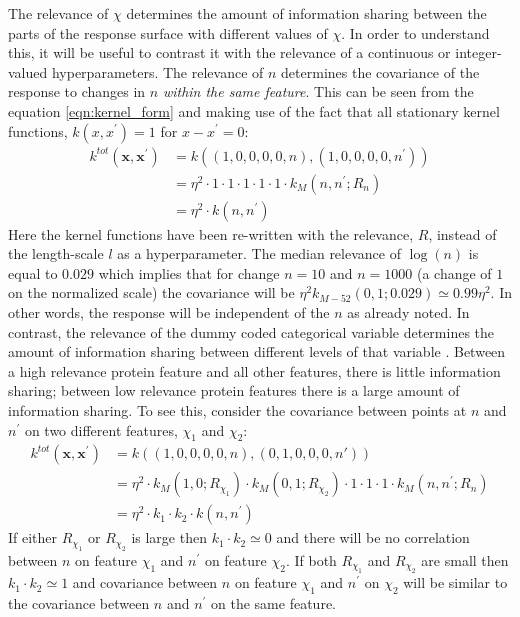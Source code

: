 The relevance of $\chi$ determines the amount of information sharing between the parts of the response surface with different values of $\chi$. In order to understand this, it will be useful to contrast it with  the relevance of a continuous or integer-valued hyperparameters.  The relevance of $n$ determines the covariance of the response to changes in $n$ \emph{within the same feature}. This can be seen from the equation \ref{eqn:kernel_form} and making use of the fact that all stationary kernel functions, $k(x, x^{\prime})=1$ for $x-x^{\prime}=0$:
\begin{equation*}
\begin{split}
    k^{tot}(\mathbf{x}, \mathbf{x}^{\prime})& = k\left((1, 0, 0, 0, 0, n), (1, 0, 0, 0, 0, n^{\prime})\right) \\
    & = \eta^{2}\cdot 1 \cdot 1\cdot 1 \cdot 1\cdot 1 \cdot k_{M}(n, n^{\prime}; R_{n}) \\
    & = \eta^{2}\cdot k(n, n^{\prime})
\end{split}
\end{equation*}
Here the kernel functions have been re-written with the relevance, $R$, instead of the length-scale $l$ as a hyperparameter. The median relevance of $\log{(n)}$ is equal to $\num{0.029}$ which implies that for change $n=10$ and $n=1000$ (a change of $1$ on the normalized scale) the covariance will be $\eta^{2}k_{M-52}(0,1; 0.029) \simeq 0.99\eta^{2}$. In other words, the response will be independent of the $n$ as already noted. In contrast, the relevance of the dummy coded categorical variable determines the amount of information sharing between different levels of that variable \cite{duvenaud2011additive}. Between a high relevance protein feature and all other features, there is little information sharing; between low relevance protein features there is a large amount of information sharing. To see this, consider the covariance between points at $n$ and $n^{\prime}$ on two different features, $\chi_1$ and $\chi_2$: 
\begin{equation*}
\begin{split}
    k^{tot}(\mathbf{x}, \mathbf{x}^{\prime})& = k\left((1, 0, 0, 0, 0, n), (0, 1, 0, 0, 0, n')\right) \\
    & = \eta^{2}\cdot k_{M}\left(1, 0; R_{\chi_1}\right) \cdot k_{M}\left(0, 1; R_{\chi_2}\right) \cdot 1 \cdot 1\cdot 1 \cdot k_{M}(n, n^{\prime}; R_{n}) \\
    &=  \eta^{2}\cdot k_{1}\cdot k_{2}\cdot k(n, n^{\prime})
\end{split}
\end{equation*}
If either $R_{\chi_1}$ or $R_{\chi_2}$ is large then $k_1 \cdot k_2 \simeq 0$ and there will be no correlation between $n$ on feature $\chi_1$ and $n^{\prime}$ on feature $\chi_2$. If both $R_{\chi_1}$ and $R_{\chi_2}$ are small then $k_1 \cdot k_2 \simeq 1$ and covariance between $n$ on feature $\chi_1$ and $n^{\prime}$ on $\chi_2$ will be similar to the covariance between $n$ and $n^{\prime}$ on the same feature.  

